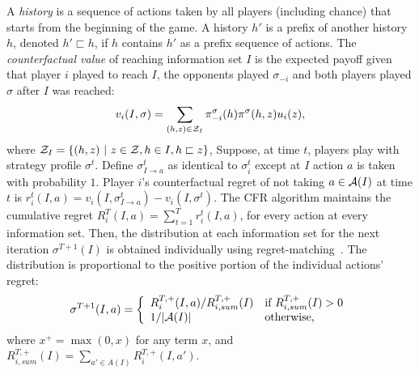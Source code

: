 A {\it history} is a sequence of actions taken by all players (including chance) that starts from the beginning of the game.
A history $h'$ is a prefix of another history $h$, denoted $h' \sqsubset h$, if $h$ contains $h'$ as a prefix sequence of actions.
The {\it counterfactual value} of reaching information set $I$ is the expected payoff given that player $i$ played to reach $I$, the opponents played
$\sigma_{-i}$ and both players played $\sigma$ after $I$ was reached:
\begin{equation}
\label{eq:cfv}
v_i(I,\sigma) = \sum_{(h,z) \in \mathcal{Z}_I} \pi^{\sigma}_{-i}(h) \pi^{\sigma}(h,z) u_i(z),
\end{equation}
where $\mathcal{Z}_I = \{ (h,z)~|~z \in \mathcal{Z}, h \in I, h \sqsubset z \}$, 
Suppose, at time $t$, players play with strategy profile $\sigma^t$.
Define $\sigma^t_{I \rightarrow a}$ as identical to $\sigma^t_i$ except at $I$ action $a$ is taken with probability $1$.
Player $i$'s counterfactual regret of not taking $a \in \mathcal{A}(I)$ at time $t$ is $r_i^t(I,a) = v_i(I, \sigma^t_{I \rightarrow a}) - v_i(I,\sigma^t)$.
The CFR algorithm maintains the cumulative regret $R_i^T(I,a) = \sum_{t=1}^T r_i^t(I,a)$, for every action at every information set.
Then, the distribution at each information set for the next iteration $\sigma^{T+1}(I)$ is obtained individually using
regret-matching~\cite{Hart00}. The distribution is proportional to the positive portion of the individual actions' regret:
\begin{equation*}
\label{eq:rm}
\sigma^{T+1}(I,a) = \left\{
\begin{array}{ll}
R_i^{T,+}(I,a) / R^{T,+}_{i,sum}(I) & \mbox{if } R^{T,+}_{i,sum}(I) > 0 \\
1 / |\mathcal{A}(I)|                   & \mbox{otherwise,}
\end{array} \right.
\end{equation*}
where $x^+ = \max(0,x)$ for any term $x$, and $R^{T,+}_{i,sum}(I) = \sum_{a' \in A(I)} R_i^{T,+}(I,a')$.
